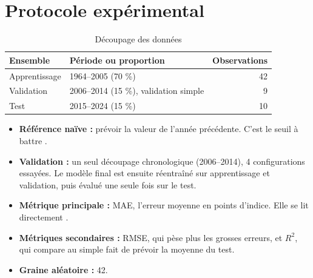 \documentclass[11pt,a4paper]{article}
\begin{document}
\section{Protocole expérimental}
\label{sec:protocole}
\begin{table}[htbp]
  \centering
  \caption{Découpage des données}
  \label{tab:decoupage}
  \small
  \begin{tabular}{@{}l l r@{}}
    \toprule
    Ensemble & Période ou proportion & Observations \\
    \midrule
    Apprentissage & 1964--2005 (70 \%) & 42 \\
    Validation & 2006--2014 (15 \%), validation simple & 9 \\
    Test & 2015--2024 (15 \%) & 10 \\
    \bottomrule
  \end{tabular}
\end{table}

\begin{itemize}
  \item \textbf{Référence naïve :} prévoir la valeur de l'année précédente. C'est le seuil à battre \cite{etat1}.
  \item \textbf{Validation :} un seul découpage chronologique (2006--2014), 4 configurations essayées. Le modèle final est ensuite réentraîné sur apprentissage et validation, puis évalué une seule fois sur le test.
  \item \textbf{Métrique principale :} MAE, l'erreur moyenne en points d'indice. Elle se lit directement \cite{metrique}.
  \item \textbf{Métriques secondaires :} RMSE, qui pèse plus les grosses erreurs, et $R^2$, qui compare au simple fait de prévoir la moyenne du test.
  \item \textbf{Graine aléatoire :} 42.
\end{itemize}

\end{document}
